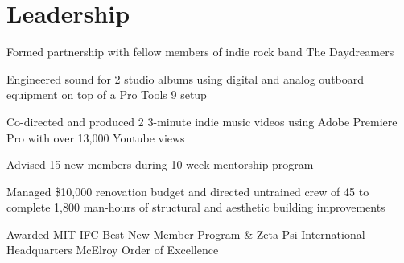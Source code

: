 \documentclass[letterpaper]{deedy-resume} %
\begin{document}
\begin{minipage}[t]{0.66\textwidth}
\sectionspace %








\section{Leadership} 


\begin{tightitemize}
\item Formed partnership with fellow members of indie rock band The Daydreamers
\item Engineered sound for 2 studio albums using digital and analog outboard equipment on top of a Pro Tools 9 setup
\item Co-directed and produced 2 3-minute indie music videos using Adobe Premiere Pro with over 13,000 Youtube views
\end{tightitemize}

\sectionspace %



\begin{tightitemize}
\item Advised 15 new members during 10 week mentorship program
\item Managed \$10,000 renovation budget and directed untrained crew of 45 to complete 1,800 man-hours of structural and aesthetic building improvements
\item Awarded MIT IFC Best New Member Program \& Zeta Psi International Headquarters McElroy Order of Excellence
\end{tightitemize}


\end{minipage}
\end{document}
